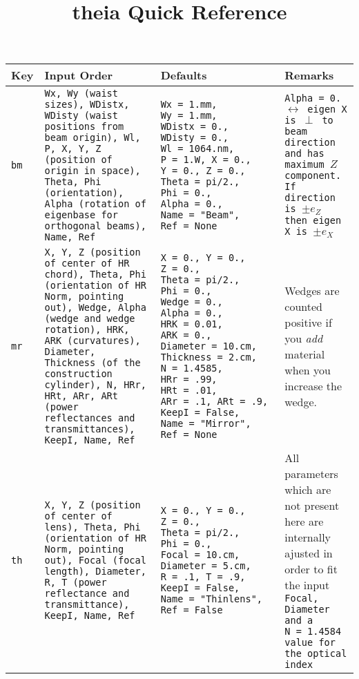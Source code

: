 \documentclass[a4paper, landscape]{article}
\title{theia Quick Reference}
\begin{document}
\begin{tabular}{| p{.6cm} | p{7cm}| p{6cm} | p{5cm} |}
\hline
\textbf{Key} & \textbf{Input Order} & \textbf{Defaults} & \textbf{Remarks} \\ \hline \hline

\tt{bm} & \tt{Wx}, \tt{Wy} (waist sizes), \tt{WDistx}, \tt{WDisty} (waist positions from beam origin), \tt{Wl}, \tt{P}, \tt{X}, \tt{Y}, \tt{Z} (position of origin in space), \tt{Theta}, \tt{Phi} (orientation), \tt{Alpha} (rotation of eigenbase for orthogonal beams), \tt{Name}, \tt{Ref}  & \tt{Wx}~=~1.mm, \tt{Wy}~=~1.mm, \tt{WDistx}~=~0., \tt{WDisty}~=~0., \tt{Wl}~=~1064.nm, \tt{P}~=~1.W, \tt{X}~=~0., \tt{Y}~=~0., \tt{Z}~=~0., \tt{Theta}~=~pi/2., \tt{Phi}~=~0., \tt{Alpha}~=~0., \tt{Name}~=~"Beam", \tt{Ref}~=~None & \tt{Alpha = 0.} $\leftrightarrow$ eigen X is $\perp$ to beam direction and has maximum $Z$ component. If direction is $\pm e_Z$ then eigen X is $\pm e_X$\\ \hline

\tt{mr} & \tt{X}, \tt{Y}, \tt{Z} (position of center of HR chord), \tt{Theta}, \tt{Phi} (orientation of HR Norm, pointing out), \tt{Wedge}, \tt{Alpha} (wedge and wedge rotation), \tt{HRK}, \tt{ARK} (curvatures), \tt{Diameter}, \tt{Thickness} (of the construction cylinder), \tt{N}, \tt{HRr}, \tt{HRt}, \tt{ARr}, \tt{ARt} (power reflectances and transmittances), \tt{KeepI}, \tt{Name}, \tt{Ref} & \tt{X}~=~0., \tt{Y}~=~0., \tt{Z}~=~0., \tt{Theta}~=~pi/2., \tt{Phi}~=~0., \tt{Wedge}~=~0., \tt{Alpha}~=~0., \tt{HRK}~=~0.01, \tt{ARK}~=~0., \tt{Diameter}~=~10.cm, \tt{Thickness}~=~2.cm, \tt{N}~=~1.4585, \tt{HRr}~=~.99, \tt{HRt}~=~.01, \tt{ARr}~=~.1, \tt{ARt}~=~.9, \tt{KeepI}~=~False, \tt{Name}~=~"Mirror", \tt{Ref}~=~None & Wedges are counted positive if you \textit{add} material when you increase the wedge.\\ \hline

\tt{th} & \tt{X}, \tt{Y}, \tt{Z} (position of center of lens), \tt{Theta}, \tt{Phi} (orientation of HR Norm, pointing out), \tt{Focal} (focal length),  \tt{Diameter}, \tt{R}, \tt{T} (power reflectance and transmittance), \tt{KeepI}, \tt{Name}, \tt{Ref} & \tt{X}~=~0., \tt{Y}~=~0., \tt{Z}~=~0., \tt{Theta}~=~pi/2., \tt{Phi}~=~0., \tt{Focal}~=~10.cm,  \tt{Diameter}~=~5.cm, \tt{R}~=~.1, \tt{T}~=~.9, \tt{KeepI}~=~False, \tt{Name}~=~"Thinlens", \tt{Ref}~=~False & All parameters which are not present here are internally ajusted in order to fit the input \tt{Focal}, \tt{Diameter} and a \tt{N}~=~1.4584 value for the optical index\\ \hline


\end{tabular}
\end{document}
